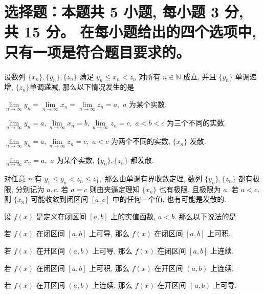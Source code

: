 \fi



\section{%
  选择题：本题共 5 小题, 每小题 3 分, 共 15 分。
  在每小题给出的四个选项中, 只有一项是符合题目要求的。
}

\begin{question}
设数列 $\{x_n\}, \{y_n\}, \{z_n\}$ 满足 $y_n \leqslant x_n < z_n$ 对所有 $n \in \mathbb{N}$ 成立, 并且 $\{y_n\}$ 单调递增, $\{z_n\}$单调递减, 那么以下情况发生的是 \paren[D]

\begin{choices}
\item $\lim\limits_{n\to\infty} y_n = \lim\limits_{n\to\infty} x_n = \lim\limits_{n\to\infty} z_n = a,$ $a$ 为某个实数.
\item $\lim\limits_{n\to\infty} y_n = a, \lim\limits_{n\to\infty} x_n = b, \lim\limits_{n\to\infty} z_n = c,$ $a < b < c$ 为三个不同的实数.
\item $\lim\limits_{n\to\infty} y_n = a, \lim\limits_{n\to\infty} z_n = c,$ $a < c$ 为两个不同的实数, $\{x_n\}$ 发散.
\item $\lim\limits_{n\to\infty} x_n = a,$ $a$ 为某个实数, $\{y_n\}, \{z_n\}$ 都发散.
\end{choices}
\end{question}

\begin{solution}
对任意 $n$ 有 $y_1 \leqslant y_n < z_n \leqslant z_1,$ 那么由单调有界收敛定理, 数列 $\{y_n\}, \{z_n\}$ 都有极限, 分别记为 $a, c.$ 若 $a = c$ 则由夹逼定理知 $\{x_n\}$ 也有极限, 且极限为 $a.$ 若 $a < c,$ 则 $\{x_n\}$ 可能收敛到闭区间 $[a, c]$ 中的任何一个值, 也有可能是发散的.
\end{solution}


\begin{question}
设 $f(x)$ 是定义在闭区间 $[a, b]$ 上的实值函数, $a < b.$ 那么以下说法的是 \paren[A]

\begin{choices}
\item 若 $f(x)$ 在闭区间 $[a, b]$ 上可导, 那么 $f(x)$ 在闭区间 $[a, b]$ 上可积.
\item 若 $f(x)$ 在开区间 $(a, b)$ 上可导, 那么 $f(x)$ 在闭区间 $[a, b]$ 上连续.
\item 若 $f(x)$ 在闭区间 $[a, b]$ 上可积, 那么 $f(x)$ 在开区间 $(a, b)$ 上连续.
\item 若 $f(x)$ 在开区间 $(a, b)$ 上连续, 那么 $f(x)$ 在开区间 $(a, b)$ 上可导.
\end{choices}
\end{question}

